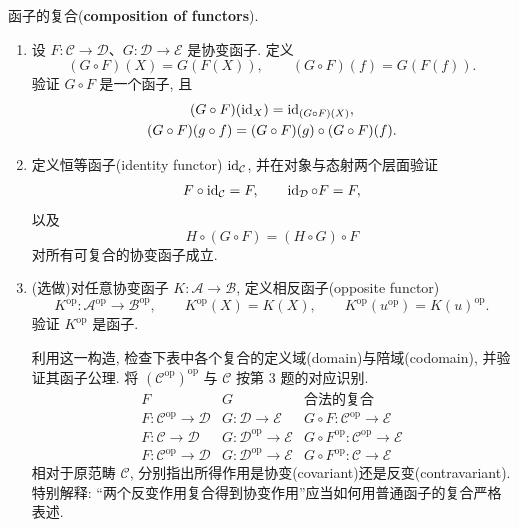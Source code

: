 \documentclass{article}
\newcommand{\op}{^{\mathrm{op}}}
\begin{document}
\begin{problem}
  {\heiti 函子的复合}(\textbf{composition of functors}).

  \begin{enumerate}
    \item[(a)] 设 $F:\mathcal C\to\mathcal D$、$G:\mathcal D\to\mathcal E$ 是协变函子. 定义
      \[
        (G\circ F)(X)=G(F(X)),\qquad (G\circ F)(f)=G(F(f)).
      \]
      验证 $G\circ F$ 是一个函子, 且
			\begin{gather*}
	      (G\circ F)(\operatorname{id}_X)=\operatorname{id}_{(G\circ F)(X)}, \\
	      (G\circ F)(g\circ f)=(G\circ F)(g)\circ(G\circ F)(f).
			\end{gather*}

    \item[(b)] 定义恒等函子(identity functor) $\operatorname{id}_{\mathcal C}$, 并在对象与态射两个层面验证
      \[
        F\circ\operatorname{id}_{\mathcal C}=F,\qquad
        \operatorname{id}_{\mathcal D}\circ F=F,
      \]
      以及
      \[
        H\circ(G\circ F)=(H\circ G)\circ F
      \]
      对所有可复合的协变函子成立.

    \item[(c)] (选做)对任意协变函子 $K:\mathcal A\to\mathcal B$, 定义相反函子(opposite functor)
      \[
        K\op:\mathcal A\op\longrightarrow\mathcal B\op,\qquad
        K\op(X)=K(X),\qquad K\op(u\op)=K(u)\op.
      \]
      验证 $K\op$ 是函子.

      利用这一构造, 检查下表中各个复合的定义域(domain)与陪域(codomain), 并验证其函子公理. 将 $(\mathcal C\op)\op$ 与 $\mathcal C$ 按第 3 题的对应识别.
      \[
        \begin{array}{c|c|c}
          F & G & \text{合法的复合}\\ \hline
          F:\mathcal C\op\to\mathcal D & G:\mathcal D\to\mathcal E & G\circ F:\mathcal C\op\to\mathcal E\\
          F:\mathcal C\to\mathcal D & G:\mathcal D\op\to\mathcal E & G\circ F\op:\mathcal C\op\to\mathcal E\\
          F:\mathcal C\op\to\mathcal D & G:\mathcal D\op\to\mathcal E & G\circ F\op:\mathcal C\to\mathcal E
        \end{array}
      \]
      相对于原范畴 $\mathcal C$, 分别指出所得作用是协变(covariant)还是反变(contravariant). 特别解释: ``两个反变作用复合得到协变作用''应当如何用普通函子的复合严格表述.
  \end{enumerate}
\end{problem}
\end{document}
